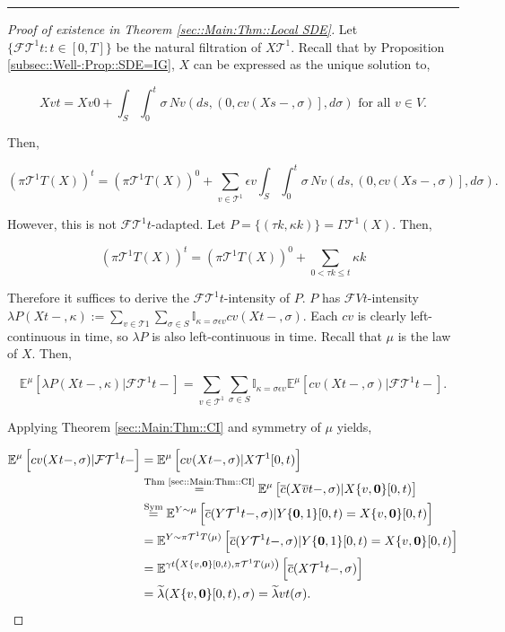 \documentclass[12pt]{article}
\newcommand{\mb}{\mathbb}
\newcommand{\mc}{\mathcal}
\newcommand{\ov}{\overline}
\newcommand{\os}{\overset}
\newcommand{\te}{\text}
\newcommand{\ep}{\epsilon}
\newcommand{\lin}{\rule{\linewidth}{0.4 pt}}
\newcommand{\exmu}[2]{\mb{E}^{#1}\left[#2\right]}	%
\renewcommand{\root}{\mathbf{0}}				%
\renewcommand{\v}{v}							%
\renewcommand{\S}{S}							%
\newcommand{\s}{\sigma}							%
\newcommand{\ev}{\ep}							%
\newcommand{\T}{T}								%
\renewcommand{\t}{t}							%
\newcommand{\proj}{\pi}							%
\renewcommand{\tt}{s}							%
\newcommand{\F}{\mc{F}}							%
\newcommand{\X}{X}								%
\newcommand{\IGr}{c}							%
\newcommand{\cl}{\ov}							%
\newcommand{\IGrg}{\ov{c}}						%
\newcommand{\tree}{\mc{T}}						%
\newcommand{\sln}[1]{^{#1}}						%
\newcommand{\poiss}{N}							%
\newcommand{\rate}{\lambda}						%
\newcommand{\alt}[1]{\widetilde{#1}}			%
\newcommand{\m}{\mu}							%
\newcommand{\cm}{\gamma}						%
\newcommand{\XX}{Y}								%
\newcommand{\rt}{\tau}							%
\renewcommand{\it}{k}							%
\newcommand{\pmap}{\Gamma}						%
\renewcommand{\mark}{\kappa}					%
\newcommand{\rp}{P}								%
\newcommand{\crate}{\alt{\lambda}}				%
\begin{document}
\lin

\begin{proof}[Proof of existence in Theorem \ref{sec::Main:Thm::Local SDE}]

Let \(\{\F{\tree\sln{1}}{\t}:\t\in [0,\T]\}\) be the natural filtration of \(\X{\tree\sln{1}}{}\). Recall that by Proposition \ref{subsec::Well-:Prop::SDE=IG}, \(\X{}{}\) can be expressed as the unique solution to,

\[\X{\v}{\t} = \X{\v}{0} + \int_\S\int_0^\t \s\,\poiss{\v}\left(d\tt,\left(0,c{\v}(\X{}{\tt-},\s)\right],d\s\right) \te{ for all } \v \in V.\]

Then,

\[\left(\proj{\tree\sln{1}}{\T}(\X{}{})\right)^\t = \left(\proj{\tree\sln{1}}{\T}(\X{}{})\right)^0 + \sum_{\v \in \tree\sln{1}}\ev{\v}\int_\S\int_0^\t \s\,\poiss{\v}\left(d\tt,\left(0,\IGr{\v}(\X{}{\tt-},\s)\right],d\s\right).\]

However, this is not \(\F{\tree\sln{1}}{\t}\)-adapted. Let \(\rp{} = \{(\rt{\it},\mark{\it})\} = \pmap{\tree\sln{1}}(\X{}{}).\) Then,

\[\left(\proj{\tree\sln{1}}{\T}(\X{}{})\right)^\t = \left(\proj{\tree\sln{1}}{\T}(\X{}{})\right)^0 + \sum_{0 < \rt{\it} \leq \t}\mark{\it}\]

Therefore it suffices to derive the \(\F{\tree\sln{1}}{\t}\)-intensity of \(\rp{}\). \(\rp{}\) has \(\F{V}{\t}\)-intensity \(\rate{\rp{}}(\X{}{\t-},\mark{}) := \sum_{\v \in \tree{1}}\sum_{\s\in \S}\mb{I}_{\mark{} = \s\ev{\v}}\IGr{\v}(\X{}{\t-},\s)\). Each \(\IGr{\v}\) is clearly left-continuous in time, so \(\rate{\rp{}}\) is also left-continuous in time. Recall that \(\m{}{}{}\) is the law of \(\X{}{}\). Then,

\[\exmu{\m{}{}{}}{\rate{\rp{}}(\X{}{\t-},\mark{})|\F{\tree\sln{1}}{\t-}} = \sum_{\v \in \tree\sln{1}}\sum_{\s\in \S} \mb{I}_{\mark{} = \s\ev{\v}}\exmu{\m{}{}{}}{\IGr{\v}(\X{}{\t-},\s)|\F{\tree\sln{1}}{\t-}}.\]

Applying Theorem \ref{sec::Main:Thm::CI} and symmetry of \(\m{}{}{}\) yields,

\begin{align*}
\exmu{\m{}{}{}}{\IGr{\v}(\X{}{\t-},\s)|\F{\tree\sln{1}}{\t-}} &= \exmu{\m{}{}{}}{\IGr{\v}(\X{}{\t-},\s)|\X{\tree\sln{1}}{[0,\t)}}\\
&\os{\te{Thm \ref{sec::Main:Thm::CI}}}{=} \exmu{\m{}{}{}}{\IGrg{}(\X{\cl{\v}}{\t-},\s)|\X{\{\v,\root\}}{[0,\t)}} \\
&\os{\te{Sym}}{=} \exmu{\XX{}{}\sim \m{}{}{}}{\IGrg{}(\XX{\tree\sln{1}}{\t-},\s)|\XX{\{\root,1\}}{[0,\t)} = \X{\{\v,\root\}}{[0,\t)}}\\
&= \exmu{\XX{}{}\sim \proj{\tree\sln{1}}{\T}(\m{}{}{})}{\IGrg{}(\XX{\tree\sln{1}}{\t-},\s)|\XX{\{\root,1\}}{[0,\t)} = \X{\{\v,\root\}}{[0,\t)}}\\
&= \exmu{\cm{\t}\left(\X{\{\v,\root\}}{[0,\t)},\proj{\tree\sln{1}}{\T}(\m{}{}{})\right)}{\IGrg{}(\X{\tree\sln{1}}{\t-},\s)}\\
&=\crate{}{}(\X{\{\v,\root\}}{[0,\t)},\s) = \crate{\v}{\t}(\s).
\end{align*}


\end{proof}
\end{document}
